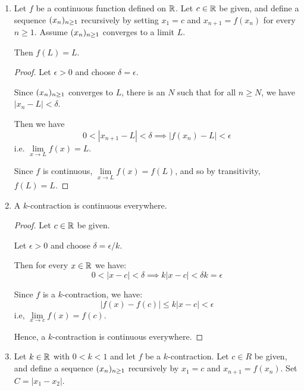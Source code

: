 \documentclass[12pt, letterpaper]{article}
\begin{document}
\begin{enumerate}[label=\bfseries4\alph*)]

\item Let $f$ be a continuous function defined on $\mathbb{R}$. Let $c \in \mathbb{R}$ be given,
and define a sequence $(x_n)_{n\geq1}$ recursively by setting $x_1 = c$ and $x_{n+1} = f(x_n)$
for every $n \geq 1$. Assume $(x_n)_{n\geq1}$ converges to a limit $L$.

Then $f(L)=L$.

\begin{proof}
    Let $\epsilon > 0$ and choose $\delta = \epsilon$.

    Since $(x_n)_{n\geq1}$ converges to $L$, there is an $N$ such that for all 
    $n \geq N$, we have $|x_n - L| < \delta$. 

    Then we have 
    \[0 < |x_{n+1} - L| < \delta \implies |f(x_n) - L| < \epsilon\] 
    i.e. $\lim\limits_{x \to L} f(x) = L$.

    Since $f$ is continuous, $\lim\limits_{x\to L} f(x)= f(L)$, and so by transitivity, $f(L) = L$.
\end{proof}


\item A $k$-contraction is continuous everywhere.

\begin{proof}
    Let $c \in \mathbb{R}$ be given. 

    Let $\epsilon > 0$ and choose $\delta = \epsilon / k$. 

    Then for every $x\in \mathbb{R}$ we have:
    \[ 0 < |x-c| < \delta \implies k|x-c| < \delta k = \epsilon \]

    Since $f$ is a $k$-contraction, we have: 
    \[ |f(x)-f(c)| \leq k|x-c| < \epsilon \]
    i.e, $\lim\limits_{x\to c} f(x)=f(c)$.

    Hence, a $k$-contraction is continuous everywhere.
\end{proof}


\item Let $k \in \mathbb{R}$ with $0 < k < 1$ and let $f$ be a $k$-contraction. Let $c \in R$
be given, and define a sequence $(x_n)_{n\geq1}$ recursively by $x_1 = c$ and 
$x_{n+1} = f(x_n)$. Set $C = |x_1 - x_2|$.


\end{enumerate}
\end{document}
